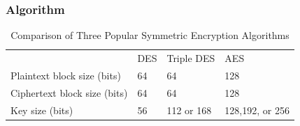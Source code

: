 \documentclass{article}
\begin{document}
                        
                                 \newpage   
                     
                        \subsubsection{Algorithm}
                                \begin{table}[h]
                                    \begin{center}
                                    \begin{tabular}{llll}
                                            \rowcolor[HTML]{34CDF9} 
                                                                        & DES & Triple DES & AES             \\
                                            Plaintext block size (bits)  & 64  & 64         & 128             \\
                                            \rowcolor[HTML]{96FFFB} 
                                            Ciphertext block size (bits) & 64  & 64         & 128             \\
                                            Key size (bits)              & 56  & 112 or 168 & 128,192, or 256
                                    \end{tabular}
                                \end{center}
                                    \caption{Comparison of Three Popular Symmetric Encryption Algorithms}
                                \end{table}
\end{document}
